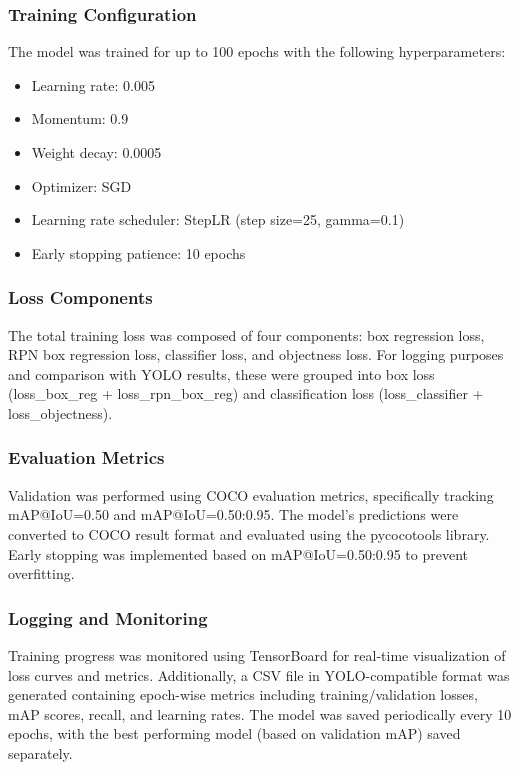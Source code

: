 \documentclass{article}
\begin{document}
\subsubsection*{Training Configuration}
The model was trained for up to 100 epochs with the following hyperparameters:
\begin{itemize}
    \item Learning rate: 0.005
    \item Momentum: 0.9
    \item Weight decay: 0.0005
    \item Optimizer: SGD
    \item Learning rate scheduler: StepLR (step size=25, gamma=0.1)
    \item Early stopping patience: 10 epochs
\end{itemize}

\subsubsection*{Loss Components}
The total training loss was composed of four components: box regression loss, RPN box regression loss, classifier loss, and objectness loss. For logging purposes and comparison with YOLO results, these were grouped into box loss (loss\_box\_reg + loss\_rpn\_box\_reg) and classification loss (loss\_classifier + loss\_objectness).

\subsubsection*{Evaluation Metrics}
Validation was performed using COCO evaluation metrics, specifically tracking mAP@IoU=0.50 and mAP@IoU=0.50:0.95. The model's predictions were converted to COCO result format and evaluated using the pycocotools library. Early stopping was implemented based on mAP@IoU=0.50:0.95 to prevent overfitting.

\subsubsection*{Logging and Monitoring}
Training progress was monitored using TensorBoard for real-time visualization of loss curves and metrics. Additionally, a CSV file in YOLO-compatible format was generated containing epoch-wise metrics including training/validation losses, mAP scores, recall, and learning rates. The model was saved periodically every 10 epochs, with the best performing model (based on validation mAP) saved separately.
\end{document}

